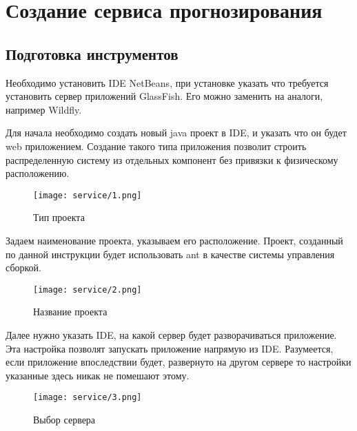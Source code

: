 \linespread{1.13}\selectfont

\chapter{Создание сервиса прогнозирования}
\section{Подготовка инструментов}
Необходимо установить IDE NetBeans, при установке указать что требуется установить сервер приложений GlassFish. Его можно заменить на аналоги, например Wildfly.  

Для начала необходимо создать новый java проект в IDE, и указать что он будет web приложением. Создание такого типа приложения позволит строить распределенную систему из отдельных компонент без привязки к физическому расположению. 

\begin{figure}[h!]
\center
	\texttt{[image: service/1.png]}
	\caption{Тип проекта}
	\label{pict:projecttype}
\end{figure}

Задаем наименование проекта, указываем его расположение. Проект, созданный по данной инструкции будет использовать ant в качестве системы управления сборкой. 

\begin{figure}[h!]
\center
	\texttt{[image: service/2.png]}
	\caption{Название проекта}
	\label{pict:projectname}
\end{figure}

Далее нужно указать IDE, на какой сервер будет разворачиваться приложение. Эта настройка позволят запускать приложение напрямую из IDE. Разумеется, если приложение впоследствии будет, развернуто на другом сервере то настройки указанные здесь никак не помешают этому.

\begin{figure}[h!]
\center
	\texttt{[image: service/3.png]}
	\caption{Выбор сервера}
	\label{pict:projectserver}
\end{figure}
